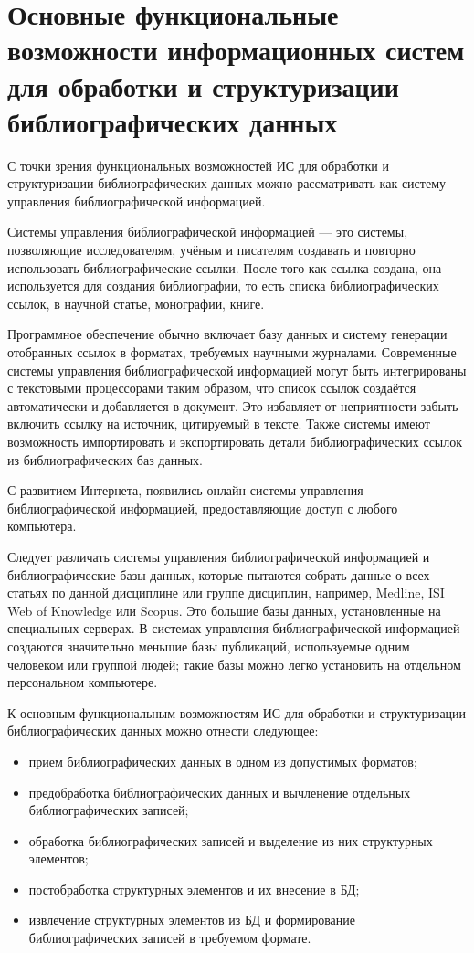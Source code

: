 \section{Основные функциональные возможности информационных систем для обработки и структуризации библиографических данных}

С точки зрения функциональных возможностей ИС для обработки и структуризации библиографических данных можно рассматривать как систему управления библиографической информацией.

Системы управления библиографической информацией — это системы, позволяющие исследователям, учёным и писателям создавать и повторно использовать библиографические ссылки. После того как ссылка создана, она используется для создания библиографии, то есть списка библиографических ссылок, в научной статье, монографии, книге.

Программное обеспечение обычно включает базу данных и систему генерации отобранных ссылок в форматах, требуемых научными журналами. Современные системы управления библиографической информацией могут быть интегрированы с текстовыми процессорами таким образом, что список ссылок создаётся автоматически и добавляется в документ. Это избавляет от неприятности забыть включить ссылку на источник, цитируемый в тексте. Также системы имеют возможность импортировать и экспортировать детали библиографических ссылок из библиографических баз данных.

С развитием Интернета, появились онлайн-системы управления библиографической информацией, предоставляющие доступ с любого компьютера.

Следует различать системы управления библиографической информацией и библиографические базы данных, которые пытаются собрать данные о всех статьях по данной дисциплине или группе дисциплин, например, Medline, ISI Web of Knowledge или Scopus. Это большие базы данных, установленные на специальных серверах. В системах управления библиографической информацией создаются значительно меньшие базы публикаций, используемые одним человеком или группой людей; такие базы можно легко установить на отдельном персональном компьютере.

К основным функциональным возможностям ИС для обработки и структуризации библиографических данных можно отнести следующее:
\begin{itemize}
	\item прием библиографических данных в одном из допустимых форматов;
	\item предобработка библиографических данных и вычленение отдельных библиографических записей;
	\item обработка библиографических записей и выделение из них структурных элементов;
	\item постобработка структурных элементов и их внесение в БД;
	\item извлечение структурных элементов из БД и формирование библиографических записей в требуемом формате.
\end{itemize}

